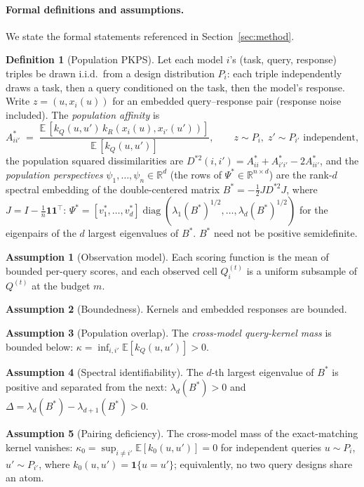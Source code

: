 \documentclass{article}
\theoremstyle{definition}
\newtheorem{definition}{Definition}
\newtheorem{assumption}{Assumption}
\theoremstyle{plain}
\newcommand{\PKPS}{PKPS\xspace}
\begin{document}
\paragraph{Formal definitions and assumptions.} We state the formal statements referenced in Section~\ref{sec:method}.
\begin{definition}[Population \PKPS]
\label{def:pop}
Let each model $i$'s (task, query, response) triples be drawn i.i.d.\ from a design
distribution $P_i$: each triple independently draws a task, then a query conditioned on
the task, then the model's response. Write $z=(u,x_i(u))$ for an embedded
query--response pair (response noise included). The \emph{population affinity} is
\[
A^*_{ii'}\;=\;\frac{\mathbb{E}\,[k_Q(u,u')\,k_R(x_i(u),x_{i'}(u'))]}{\mathbb{E}\,[k_Q(u,u')]},
\qquad z\sim P_i,\; z'\sim P_{i'} \text{ independent},
\]
the population squared dissimilarities are $D^{*2}(i,i')=A^*_{ii}+A^*_{i'i'}-2A^*_{ii'}$, and
the \emph{population perspectives} $\psi_1,\dots,\psi_n\in\mathbb{R}^d$ (the rows of
$\Psi^*\in\mathbb{R}^{n\times d}$) are the rank-$d$ spectral embedding of the
double-centered matrix $B^*=-\tfrac12 J D^{*2} J$, where $J=I-\tfrac1n\mathbf{1}\mathbf{1}^\top$:
$\Psi^*=[v^*_1,\dots,v^*_d]\operatorname{diag}(\lambda_1(B^*)^{1/2},\dots,\lambda_d(B^*)^{1/2})$
for the eigenpairs of the $d$ largest eigenvalues of $B^*$. $B^*$ need not be positive
semidefinite.
\end{definition}
\begin{assumption}[Observation model]\label{ass:noise}
Each scoring function is the mean of bounded per-query scores, and each observed cell
$Q_{i}^{(t)}$ is a uniform subsample of $Q^{(t)}$ at the budget $m$.
\end{assumption}
\begin{assumption}[Boundedness]\label{ass:bound}
Kernels and embedded responses are bounded.
\end{assumption}
\begin{assumption}[Population overlap]\label{ass:overlap}
The \emph{cross-model query-kernel mass} is bounded below:
$\kappa=\inf_{i,i'}\mathbb{E}[k_Q(u,u')]>0$.
\end{assumption}
\begin{assumption}[Spectral identifiability]\label{ass:spec}
The $d$-th largest eigenvalue of $B^*$ is positive and separated from the next:
$\lambda_d(B^*)>0$ and $\Delta=\lambda_d(B^*)-\lambda_{d+1}(B^*)>0$.
\end{assumption}
\begin{assumption}[Pairing deficiency]\label{ass:gap}
The cross-model mass of the exact-matching kernel vanishes:
$\kappa_{0}=\sup_{i\neq i'}\mathbb{E}[k_{0}(u,u')]=0$ for independent queries
$u\sim P_{i}$, $u'\sim P_{i'}$, where $k_{0}(u,u')=\mathbf{1}\{u=u'\}$;
equivalently, no two query designs share an atom.
\end{assumption}
\end{document}
